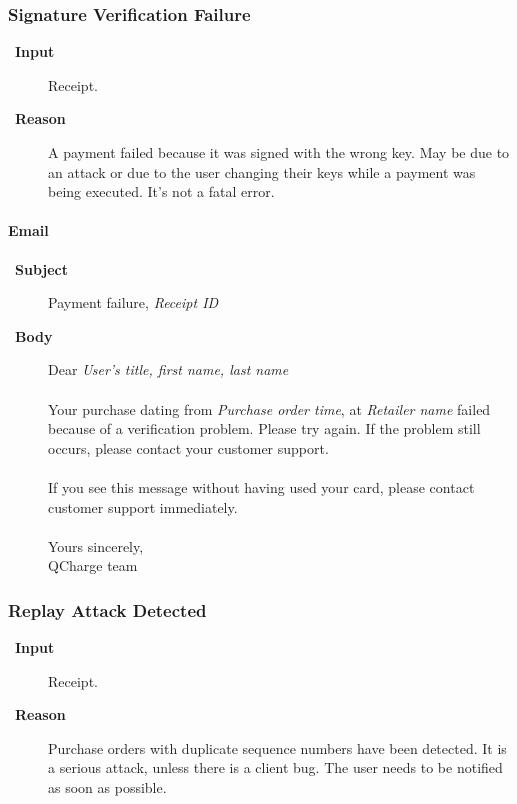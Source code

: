 \documentclass[a4paper,10pt]{article}
\let\Item\item
\newcommand\SpecialItem{\renewcommand\item[1][]{\Item[\textbullet~\bfseries##1]}
}
\begin{document}
\subsubsection{Signature Verification Failure}

\SpecialItem
\begin{description}
 \item[Input] Receipt.
 \item[Reason] A payment failed because it was signed with the wrong key. May 
be due to an attack or due to the user changing their keys while a payment was 
being executed. It's not a fatal error.
\end{description}

\paragraph{Email}
\SpecialItem
\begin{description}
 \item[Subject] Payment failure, \emph{Receipt ID}
 \item[Body] Dear \emph{User's title, first name, last name}
\\\\
Your purchase dating from \emph{Purchase order time}, at \emph{Retailer name}
failed because of a verification problem. Please try again. If the problem 
still occurs, please contact your customer support.
\\\\
If you see this message without having used your card, please contact customer 
support immediately.
\\\\
Yours sincerely,\\
QCharge team

\end{description}

\subsubsection{Replay Attack Detected}

\SpecialItem
\begin{description}
 \item[Input] Receipt.
 \item[Reason] Purchase orders with duplicate sequence numbers have been 
detected. It is a serious attack, unless there is a client bug. The user needs 
to be notified as soon as possible.
\end{description}
\end{document}
